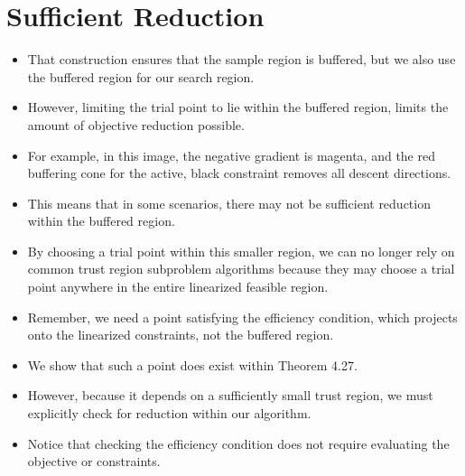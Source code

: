 \documentclass{article}
\begin{document}
	\section{Sufficient Reduction}
\begin{itemize}
\item That construction ensures that the sample region is buffered, but we also use the buffered region for our search region.
\item However, limiting the trial point to lie within the buffered region, limits the amount of objective reduction possible.
\item For example, in this image, the negative gradient is magenta, and the red buffering cone for the active, black constraint removes all descent directions.
\item This means that in some scenarios, there may not be sufficient reduction within the buffered region.
\end{itemize}

\hrulefill

\begin{itemize}
\item By choosing a trial point within this smaller region, we can no longer rely on common trust region subproblem algorithms because they may choose a trial point anywhere in the entire linearized feasible region.
\item Remember, we need a point satisfying the efficiency condition, which projects onto the linearized constraints, not the buffered region.
\item We show that such a point does exist within Theorem 4.27.
\item However, because it depends on a sufficiently small trust region, we must explicitly check for reduction within our algorithm.
\item Notice that checking the efficiency condition does not require evaluating the objective or constraints.
\end{itemize}

\hrulefill
\end{document}
